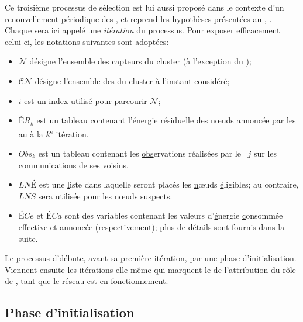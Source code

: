 Ce troisième processus de sélection est lui aussi proposé dans le contexte d'un renouvellement périodique des \cns, et reprend les hypothèses présentées au , .
Chaque  sera ici appelé une \emph{itération} du processus.
Pour exposer efficacement celui-ci, les notations suivantes sont adoptées:
\begin{itemize}
    \item $\mathcal{N}$ désigne l'ensemble des capteurs du cluster (à l'exception du \ch);
    \item $\mathcal{CN}$ désigne l'ensemble des \cns du cluster à l'instant considéré;
    \item $i$ est un index utilisé pour parcourir $\mathcal{N}$;
    \item $\mathit{ÉR}_k$ est un tableau contenant l'\underline{é}nergie \underline{r}ésiduelle des nœuds annoncée par les \cns au \ch à la $k$\textsuperscript{e} itération.
    \item $\mathit{Obs}_k$ est un tableau contenant les \underline{obs}ervations réalisées par le \cn~$j$ sur les communications de ses voisins.
    \item $\mathit{LNÉ}$ est une \underline{l}iste dans laquelle seront placés les \underline{n}œuds \underline{é}ligibles; au contraire, $\mathit{LNS}$ sera utilisée pour les nœuds \underline{s}uspects.
    \item $\mathit{ÉCe}$ et $\mathit{ÉCa}$ sont des variables contenant les valeurs d'\underline{é}nergie \underline{c}onsommée \underline{e}ffec\-tive et \underline{a}nnoncée (respectivement); plus de détails sont fournis dans la suite.
\end{itemize}

Le processus d'\election débute, avant sa première itération, par une phase d'initialisation.
Viennent ensuite les itérations elle-même qui marquent le  de l'attribution du rôle de \cn, tant que le réseau est en fonctionnement.

    \subsection{Phase d'initialisation}


